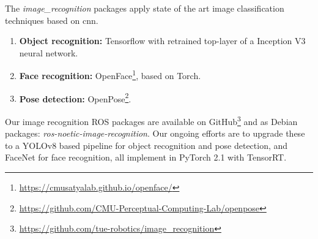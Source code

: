 The \emph{image\_recognition} packages apply state of the art image classification techniques based on \acrfull{cnn}.


\begin{enumerate}
\item \textbf{Object recognition:} Tensorflow\texttrademark\hspace{0em} with retrained top-layer of a Inception V3 neural network.

\item \textbf{Face recognition:} OpenFace\footnote{\url{https://cmusatyalab.github.io/openface/}}, based on Torch.

\item \textbf{Pose detection:} OpenPose\footnote{\url{https://github.com/CMU-Perceptual-Computing-Lab/openpose}}.
\end{enumerate}
Our image recognition ROS packages are available on GitHub\footnote{\url{https://github.com/tue-robotics/image_recognition}} and as Debian packages: \emph{ros-noetic-image-recognition}.
Our ongoing efforts are to upgrade these to a YOLOv8 based pipeline for object recognition and pose detection, and FaceNet for face recognition, all implement in PyTorch 2.1 with TensorRT.